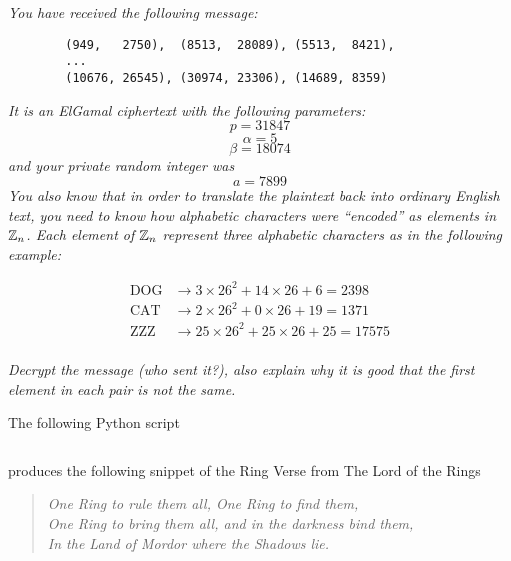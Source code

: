 \documentclass[12pt]{article}
\begin{document}
\newpage

\section{} \textit{You have received the following message:}

    \begin{verbatim}
        (949,   2750),  (8513,  28089), (5513,  8421),
        ...
        (10676, 26545), (30974, 23306), (14689, 8359)
    \end{verbatim}

    \textit{It is an ElGamal ciphertext with the following parameters:}
        $$p = 31847$$
        $$\alpha = 5$$
        $$\beta = 18074$$
    \textit{and your private random integer was}
        $$a = 7899$$
    \textit{You also know that in order to translate the plaintext back into ordinary English text, you need to know how alphabetic characters were ``encoded'' as elements in $\mathbb{Z}_n$.  Each element of $\mathbb{Z}_n$ represent three alphabetic characters as in the following example:}

        \begin{align*}
            \text{DOG} &\to 3  \times 26^2 + 14 \times 26 + 6  = 2398\\
            \text{CAT} &\to 2  \times 26^2 + 0  \times 26 + 19 = 1371\\
            \text{ZZZ} &\to 25 \times 26^2 + 25 \times 26 + 25 = 17575\\
        \end{align*}

    \textit{Decrypt the message (who sent it?), also explain why it is good that the first element in each pair is not the same.}

    The following Python script

    \inputminted{python}{scripts/prob_6.py}

    produces the following snippet of the Ring Verse from The Lord of the Rings

    \begin{quote}
        \centering
        \textit{One Ring to rule them all, One Ring to find them,}\\
        \textit{One Ring to bring them all, and in the darkness bind them,}\\
        \textit{In the Land of Mordor where the Shadows lie.}\\
    \end{quote}
\end{document}

